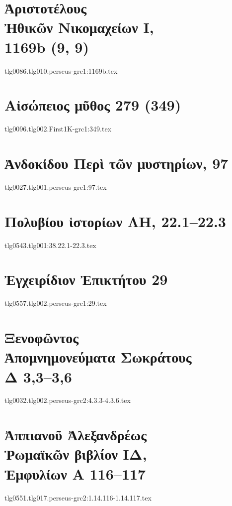 \documentclass[a4paper,12pt,twoside]{report}
\begin{document}
\chapter[Ἀριστοτέλους Ἠθικῶν Νικομαχείων Ι]{\textgreek[variant=ancient]{Ἀριστοτέλους \\Ἠθικῶν Νικομαχείων Ι,} \\1169b (9, 9)}
{tlg0086.tlg010.perseus-grc1:1169b.tex}

\chapter[Αἰσώπειος μῦθος 279]{\textgreek[variant=ancient]{Αἰσώπειος μῦθος} 279 (349)}
{tlg0096.tlg002.First1K-grc1:349.tex}

\chapter[Ἀνδοκίδου Περὶ τῶν μυστηρίων]{\textgreek[variant=ancient]{Ἀνδοκίδου Περὶ τῶν μυστηρίων,} 97}
{tlg0027.tlg001.perseus-grc1:97.tex}

\chapter[Πολυβίου Ἱστορίων ΛΗ]{\textgreek[variant=ancient]{Πολυβίου ἱστορίων ΛΗ,} 22.1–22.3}
{tlg0543.tlg001:38.22.1-22.3.tex}

\chapter[Ἐγχειρίδιον Ἐπικτήτου 29]{\textgreek[variant=ancient]{Ἐγχειρίδιον Ἐπικτήτου} 29}
{tlg0557.tlg002.perseus-grc1:29.tex}

\chapter[Ξενοφῶντος Ἀπομνημονεύματα Σωκράτους]{\textgreek[variant=ancient]{Ξενοφῶντος \\Ἀπομνημονεύματα Σωκράτους \\Δ} 3,3–3,6}
{tlg0032.tlg002.perseus-grc2:4.3.3-4.3.6.tex}

\chapter[Ἀππιανοῦ Ῥωμαϊκῶν ΙΔ]{\textgreek[variant=ancient]{Ἀππιανοῦ Ἀλεξανδρέως \\Ῥωμαϊκῶν βιβλίον ΙΔ, \\Ἐμφυλίων Α} 116–117}
{tlg0551.tlg017.perseus-grc2:1.14.116-1.14.117.tex}
\end{document}
